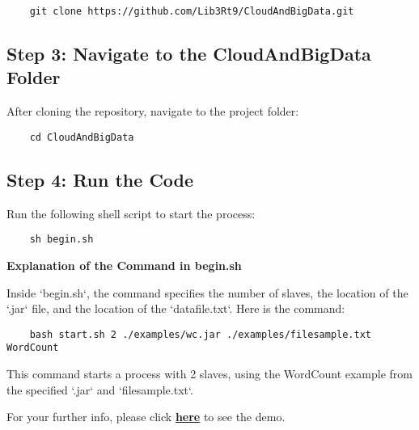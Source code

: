\documentclass{article}
\begin{document}
\begin{verbatim}
    git clone https://github.com/Lib3Rt9/CloudAndBigData.git
\end{verbatim}

\subsection{Step 3: Navigate to the CloudAndBigData Folder}
After cloning the repository, navigate to the project folder:

\begin{verbatim}
    cd CloudAndBigData
\end{verbatim}

\subsection{Step 4: Run the Code}
Run the following shell script to start the process:

\begin{verbatim}
    sh begin.sh
\end{verbatim}
\textbf{Explanation of the Command in begin.sh}

Inside `begin.sh`, the command specifies the number of slaves, the location of the `.jar` file, and the location of the `datafile.txt`. Here is the command:

\begin{verbatim}
    bash start.sh 2 ./examples/wc.jar ./examples/filesample.txt WordCount
\end{verbatim}
This command starts a process with 2 slaves, using the WordCount example from the specified `.jar` and `filesample.txt`.

For your further info, please click \href{https://drive.google.com/drive/folders/1BraaCsrYe4OM4E_PID_7c6j7Q6bSh4RE?usp=drive_link}{\textbf{here}} to see the demo.
\end{document}
